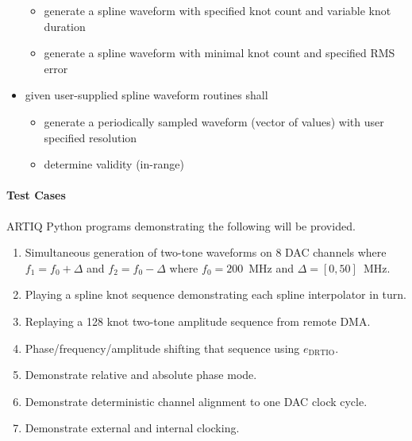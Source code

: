 \documentclass[english]{article}
\begin{document}
\begin{itemize}
\begin{itemize}
		\item generate a spline waveform with specified knot count and variable knot duration 
		\item generate a spline waveform with minimal knot count and specified RMS error
	\end{itemize}
	\item given user-supplied spline waveform routines shall
	\begin{itemize}
		\item generate a periodically sampled waveform (vector of values) with user specified resolution
		\item determine validity (in-range)
	\end{itemize}

\end{itemize}

\paragraph{Test Cases}

ARTIQ Python programs demonstrating the following will be provided.

\begin{enumerate}
	\item Simultaneous generation of two-tone waveforms on 8 DAC channels where $f_{1}=f_{0}+\Delta$ and $f_{2}=f_{0}-\Delta$ where $f_{0}=200$~MHz and $\Delta=[0,50]$~MHz.
	\item Playing a spline knot sequence demonstrating each spline interpolator in
		turn.
	\item Replaying a 128 knot two-tone amplitude sequence from remote DMA.
	\item Phase/frequency/amplitude shifting that sequence using $e_\mathrm{DRTIO}$.
	\item Demonstrate relative and absolute phase mode.
	\item Demonstrate deterministic channel alignment to one DAC clock cycle.
	\item Demonstrate external and internal clocking.
\end{enumerate}
\end{document}
